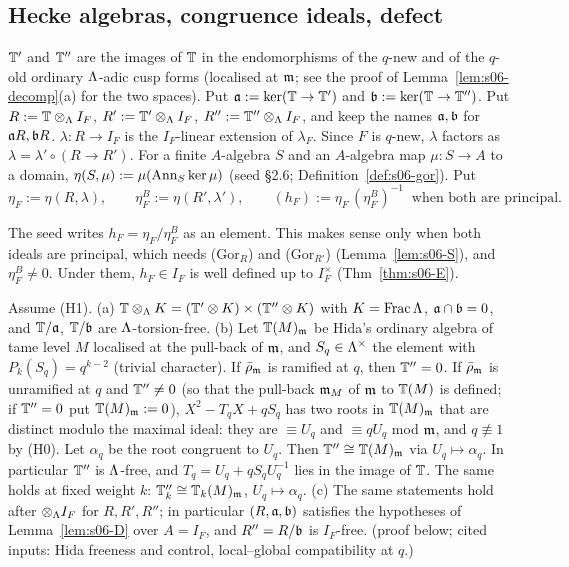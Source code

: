\subsection{Hecke algebras, congruence ideals, defect}\label{ss:s06-rings}
\begin{definition}[seed \S9.1]\label{def:s06-rings}
$\mathbb{T}'$ and $\mathbb{T}''$ are the images of $\mathbb{T}$ in the endomorphisms of the $q$-new and of the $q$-old ordinary $\Lambda$-adic cusp forms
(localised at $\mathfrak{m}$; see the proof of Lemma~\ref{lem:s06-decomp}(a) for the two spaces). Put $\mathfrak{a}:=\ker(\mathbb{T}\to\mathbb{T}')$ and
$\mathfrak{b}:=\ker(\mathbb{T}\to\mathbb{T}'')$. Put $R:=\mathbb{T}\otimes_\Lambda I_F$, $R':=\mathbb{T}'\otimes_\Lambda I_F$, $R'':=\mathbb{T}''\otimes_\Lambda I_F$, and keep the names
$\mathfrak{a},\mathfrak{b}$ for $\mathfrak{a} R,\mathfrak{b} R$. $\lambda:R\to I_F$ is the $I_F$-linear extension of $\lambda_F$. Since $F$ is $q$-new, $\lambda$ factors
as $\lambda=\lambda'\circ(R\to R')$. For a finite $A$-algebra $S$ and an $A$-algebra map $\mu:S\to A$ to a domain,
$\eta(S,\mu):=\mu(\operatorname{Ann}_S\ker\mu)$ (seed \S2.6; Definition~\ref{def:s06-gor}). Put
\[\eta_F:=\eta(R,\lambda),\qquad \eta^B_F:=\eta(R',\lambda'),\qquad (h_F):=\eta_F\,(\eta^B_F)^{-1}\ \text{ when both are principal.}\]
\end{definition}
The seed writes $h_F=\eta_F/\eta^B_F$ as an element. This makes sense only when both ideals are principal, which needs (Gor$_R$) and
(Gor$_{R'}$) (Lemma~\ref{lem:s06-S}), and $\eta^B_F\ne0$. Under them, $h_F\in I_F$ is well defined up to $I_F^\times$
(Thm~\ref{thm:s06-E}).

\begin{lemma}\label{lem:s06-decomp}
Assume (H1). (a) $\mathbb{T}\otimes_\Lambda K=(\mathbb{T}'\otimes K)\times(\mathbb{T}''\otimes K)$ with $K=\mathrm{Frac}\,\Lambda$, $\mathfrak{a}\cap\mathfrak{b}=0$, and
$\mathbb{T}/\mathfrak{a}$, $\mathbb{T}/\mathfrak{b}$ are $\Lambda$-torsion-free. (b) Let $\mathbb{T}(M)_{\mathfrak{m}}$ be Hida's ordinary algebra of tame level $M$ localised at the
pull-back of $\mathfrak{m}$, and $S_q\in\Lambda^\times$ the element with $P_k(S_q)=q^{k-2}$ (trivial character). If $\bar\rho_{\mathfrak{m}}$ is ramified at
$q$, then $\mathbb{T}''=0$. If $\bar\rho_{\mathfrak{m}}$ is unramified at $q$ and $\mathbb{T}''\ne0$ (so that the pull-back $\mathfrak{m}_M$ of $\mathfrak{m}$ to $\mathbb{T}(M)$ is defined; if $\mathbb{T}''=0$ put $\mathbb{T}(M)_{\mathfrak{m}}:=0$), $X^2-T_qX+qS_q$ has two roots in $\mathbb{T}(M)_{\mathfrak{m}}$ that are distinct modulo the maximal ideal: they are
$\equiv U_q$ and $\equiv qU_q$ mod $\mathfrak{m}$, and $q\not\equiv1$ by (H0). Let $\alpha_q$ be the root congruent to $U_q$. Then
$\mathbb{T}''\cong\mathbb{T}(M)_{\mathfrak{m}}$ via $U_q\mapsto\alpha_q$. In particular $\mathbb{T}''$ is $\Lambda$-free, and $T_q=U_q+qS_qU_q^{-1}$ lies in the image
of $\mathbb{T}$. The same holds at fixed weight $k$: $\mathbb{T}''_k\cong\mathbb{T}_k(M)_{\mathfrak{m}}$, $U_q\mapsto\alpha_q$.
 (c) The same statements
hold after $\otimes_\Lambda I_F$ for $R,R',R''$; in particular $(R,\mathfrak{a},\mathfrak{b})$ satisfies the hypotheses of Lemma~\ref{lem:s06-D} over
$A=I_F$, and $R''=R/\mathfrak{b}$ is $I_F$-free. \stpmc{} (proof below; cited inputs: Hida freeness and control, local--global
compatibility at $q$.)
\end{lemma}

